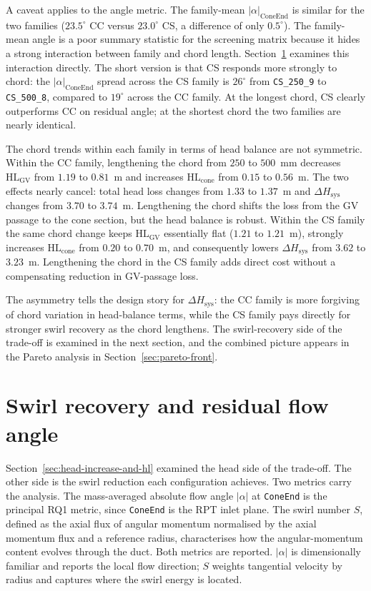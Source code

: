 A caveat applies to the angle metric. The family-mean $|\alpha|_{\mathrm{ConeEnd}}$ is similar for the two families ($23.5^\circ$ CC versus $23.0^\circ$ CS, a difference of only $0.5^\circ$). The family-mean angle is a poor summary statistic for the screening matrix because it hides a strong interaction between family and chord length. Section~\ref{sec:swirl-recovery} examines this interaction directly. The short version is that CS responds more strongly to chord: the $|\alpha|_{\mathrm{ConeEnd}}$ spread across the CS family is $26^\circ$ from \texttt{CS\_250\_9} to \texttt{CS\_500\_8}, compared to $19^\circ$ across the CC family. At the longest chord, CS clearly outperforms CC on residual angle; at the shortest chord the two families are nearly identical.

The chord trends within each family in terms of head balance are not symmetric. Within the CC family, lengthening the chord from $250$ to $500$~mm decreases $\mathrm{HL_{GV}}$ from $1.19$ to $0.81$~m and increases $\mathrm{HL_{cone}}$ from $0.15$ to $0.56$~m. The two effects nearly cancel: total head loss changes from $1.33$ to $1.37$~m and $\Delta H_{\mathrm{sys}}$ changes from $3.70$ to $3.74$~m. Lengthening the chord shifts the loss from the GV passage to the cone section, but the head balance is robust. Within the CS family the same chord change keeps $\mathrm{HL_{GV}}$ essentially flat ($1.21$ to $1.21$~m), strongly increases $\mathrm{HL_{cone}}$ from $0.20$ to $0.70$~m, and consequently lowers $\Delta H_{\mathrm{sys}}$ from $3.62$ to $3.23$~m. Lengthening the chord in the CS family adds direct cost without a compensating reduction in GV-passage loss.

The asymmetry tells the design story for $\Delta H_{\mathrm{sys}}$: the CC family is more forgiving of chord variation in head-balance terms, while the CS family pays directly for stronger swirl recovery as the chord lengthens. The swirl-recovery side of the trade-off is examined in the next section, and the combined picture appears in the Pareto analysis in Section~\ref{sec:pareto-front}.

\section{Swirl recovery and residual flow angle}
\label{sec:swirl-recovery}

Section~\ref{sec:head-increase-and-hl} examined the head side of the trade-off. The other side is the swirl reduction each configuration achieves. Two metrics carry the analysis. The mass-averaged absolute flow angle $|\alpha|$ at \texttt{ConeEnd} is the principal RQ1 metric, since \texttt{ConeEnd} is the RPT inlet plane. The swirl number $S$, defined as the axial flux of angular momentum normalised by the axial momentum flux and a reference radius, characterises how the angular-momentum content evolves through the duct. Both metrics are reported. $|\alpha|$ is dimensionally familiar and reports the local flow direction; $S$ weights tangential velocity by radius and captures where the swirl energy is located.

